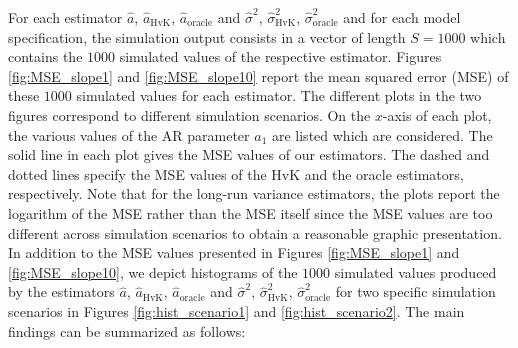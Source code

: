 For each estimator $\widehat{a}$, $\widehat{a}_{\text{HvK}}$, $\widehat{a}_{\text{oracle}}$ and $\widehat{\sigma}^2$, $\widehat{\sigma}^2_{\text{HvK}}$, $\widehat{\sigma}^2_{\text{oracle}}$ and for each model specification, the simulation output consists in a vector of length $S=1000$ which contains the $1000$ simulated values of the respective estimator. Figures \ref{fig:MSE_slope1} and \ref{fig:MSE_slope10} report the mean squared error (MSE) of these $1000$ simulated values for each estimator. The different plots in the two figures correspond to different simulation scenarios. On the $x$-axis of each plot, the various values of the AR parameter $a_1$ are listed which are considered. The solid line in each plot gives the MSE values of our estimators. The dashed and dotted lines specify the MSE values of the HvK and the oracle estimators, respectively. Note that for the long-run variance estimators, the plots report the logarithm of the MSE rather than the MSE itself since the MSE values are too different across simulation scenarios to obtain a reasonable graphic presentation. In addition to the MSE values presented in Figures \ref{fig:MSE_slope1} and \ref{fig:MSE_slope10}, we depict histograms of the $1000$ simulated values produced by the estimators $\widehat{a}$, $\widehat{a}_{\text{HvK}}$, $\widehat{a}_{\text{oracle}}$ and $\widehat{\sigma}^2$, $\widehat{\sigma}^2_{\text{HvK}}$, $\widehat{\sigma}^2_{\text{oracle}}$ for two specific simulation scenarios in Figures \ref{fig:hist_scenario1} and \ref{fig:hist_scenario2}. The main findings can be summarized as follows:  
